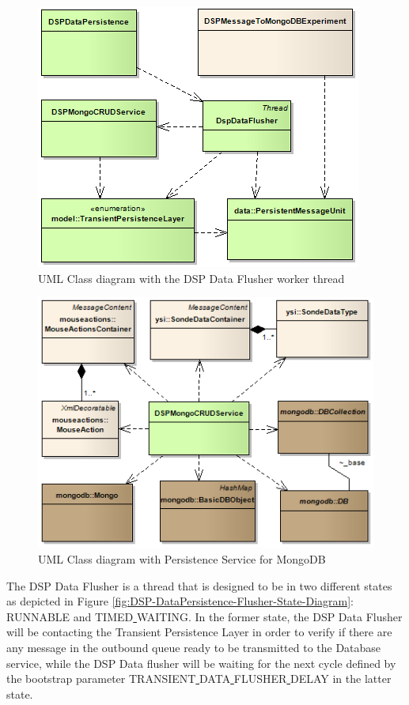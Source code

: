 \begin{figure}[!b]
  \centering
  \includegraphics[scale=0.5]{../diagrams/DSP-DataPersistence-Flusher-Classes}
  \caption{UML Class diagram with the DSP Data Flusher worker thread}
  \label{fig:DSP-DataPersistence-Flusher-Classes}
\end{figure}

\begin{figure}[!b]
  \centering
  \includegraphics[scale=0.5]{../diagrams/DSP-Data-Persistence-Mongo-Classes}
  \caption{UML Class diagram with Persistence Service for MongoDB}
  \label{fig:DSP-Data-Persistence-Mongo-Classes}
\end{figure}

The DSP Data Flusher is a thread that is designed to be in two different
states as depicted in Figure
\ref{fig:DSP-DataPersistence-Flusher-State-Diagram}: RUNNABLE and
TIMED\underline{ }WAITING. In the former state, the DSP Data Flusher will be
contacting the Transient Persistence Layer in order to verify if there are any
message in the outbound queue ready to be transmitted to the Database
service, while the DSP Data flusher will be waiting for the next cycle defined
by the bootstrap parameter TRANSIENT\underline{ }DATA\underline{
}FLUSHER\underline{ }DELAY in the latter state.


